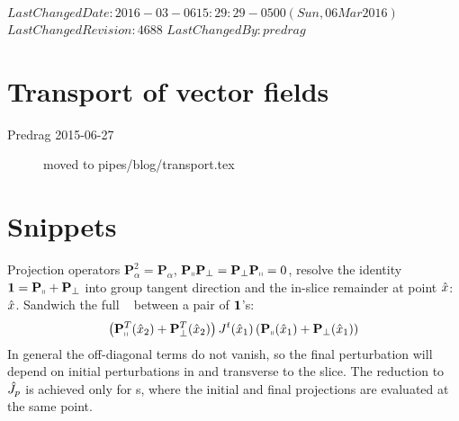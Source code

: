\ifsvnmulti
 {$LastChangedDate: 2016-03-06 15:29:29 -0500 (Sun, 06 Mar 2016) $}
 {$LastChangedRevision: 4688 $} {$LastChangedBy: predrag $}
\fi

\section{Transport of vector fields}
\label{sect:transport}
%
\renewcommand{\ssp}{x}

\begin{description}

\item[Predrag 2015-06-27]
moved to  pipes/blog/transport.tex
\end{description}


\section{Snippets}

Projection operators $\mathbf{P}_{\alpha}^2 = \mathbf{P}_{\alpha}$,
$\mathbf{P}_{\shortparallel} \mathbf{P}_{\perp} = \mathbf{P}_{\perp}
\mathbf{P}_{\shortparallel} =0 $, resolve the identity ${\bf 1} =
\mathbf{P}_{\shortparallel} + \mathbf{P}_{\perp} $ into group tangent
direction and the in-slice remainder at point $\sspRed$:
$\sspRed$. Sandwich the full \statesp\ {\JacobianM} between a pair of
${\bf 1}$'s:
\[
\left(\mathbf{P}_{\shortparallel}^T(\sspRed_2)
      + \mathbf{P}_{\perp}^T(\sspRed_2) \right)
\jMps^\zeit(\sspRed_1)
\left(\mathbf{P}_{\shortparallel}(\sspRed_1)
      + \mathbf{P}_{\perp}(\sspRed_1) \right)
\]
In general the off-diagonal terms do not vanish, so the final
perturbation will depend on initial perturbations in and transverse to
the slice. The reduction to $\hat{J}_{p}$ is achieved only for \rpo
s, where the initial and final projections are evaluated at the same
point.

